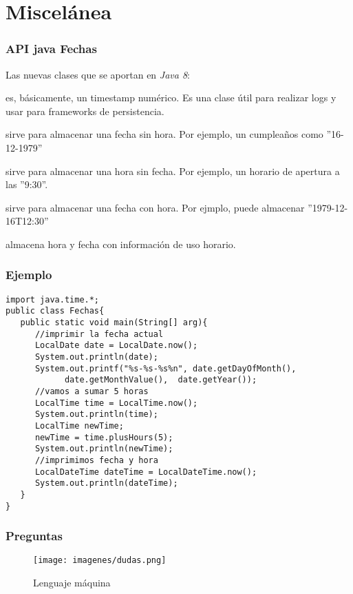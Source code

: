 \documentclass{beamer}
\begin{document}
\section{Miscelánea}
\begin{frame}
\frametitle{API java Fechas}
Las nuevas clases que se aportan en \emph{Java 8}:
\begin{description}[<+->]
\item[Instant] es, básicamente, un timestamp numérico. Es una clase útil para realizar logs y usar para frameworks de persistencia.
\item[LocalDate] sirve para almacenar una fecha sin hora. Por ejemplo, un cumpleaños como ''16-12-1979''
\item[LocalTime] sirve para almacenar una hora sin fecha. Por ejemplo, un horario de apertura a las ''9:30''.
\item[LocalDateTime] sirve para almacenar una fecha con hora. Por ejmplo, puede almacenar ''1979-12-16T12:30''
\item[ZonedDateTime] almacena hora y fecha con información de uso horario.
\end{description}
\end{frame}

\begin{frame}[fragile]
\frametitle{Ejemplo}
\begin{footnotesize}
\begin{verbatim}
import java.time.*;
public class Fechas{
   public static void main(String[] arg){
      //imprimir la fecha actual
      LocalDate date = LocalDate.now();
      System.out.println(date);
      System.out.printf("%s-%s-%s%n", date.getDayOfMonth(),
            date.getMonthValue(),  date.getYear());
      //vamos a sumar 5 horas
      LocalTime time = LocalTime.now();
      System.out.println(time);
      LocalTime newTime;
      newTime = time.plusHours(5);
      System.out.println(newTime);
      //imprimimos fecha y hora
      LocalDateTime dateTime = LocalDateTime.now();
      System.out.println(dateTime);
   }
}
\end{verbatim}
\end{footnotesize}
\end{frame}

\begin{frame}
\frametitle{Preguntas} 
\begin{figure}
\texttt{[image: imagenes/dudas.png]} 
\caption{Lenguaje máquina}
\end{figure} 
\end{frame}
\end{document}
